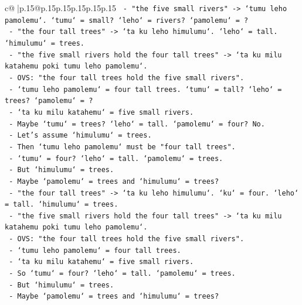 \documentclass{article}
\begin{document}
{\begin{supertabular}{c@{$\;$}|p{.15\linewidth}@{}p{.15\linewidth}p{.15\linewidth}p{.15\linewidth}p{.15\linewidth}p{.15\linewidth}}
{{{\texttt{            {-} "the five small rivers" {-}> `tumu leho pamolemu`. `tumu` = small? `leho` = rivers? `pamolemu` = ?} \\
\texttt{            {-} "the four tall trees" {-}> `ta ku leho himulumu`. `leho` = tall. `himulumu` = trees.} \\
\texttt{            {-} "the five small rivers hold the four tall trees" {-}> `ta ku milu katahemu poki tumu leho pamolemu`.} \\
\texttt{              {-} OVS: "the four tall trees hold the five small rivers".} \\
\texttt{              {-} `tumu leho pamolemu` = four tall trees. `tumu` = tall? `leho` = trees? `pamolemu` = ?} \\
\texttt{              {-} `ta ku milu katahemu` = five small rivers.} \\
\texttt{              {-} Maybe `tumu` = trees? `leho` = tall. `pamolemu` = four? No.} \\
\texttt{              {-} Let's assume `himulumu` = trees.} \\
\texttt{              {-} Then `tumu leho pamolemu` must be "four tall trees".} \\
\texttt{              {-} `tumu` = four? `leho` = tall. `pamolemu` = trees.} \\
\texttt{              {-} But `himulumu` = trees.} \\
\texttt{              {-} Maybe `pamolemu` = trees and `himulumu` = trees?} \\
\texttt{              {-} "the four tall trees" {-}> `ta ku leho himulumu`. `ku` = four. `leho` = tall. `himulumu` = trees.} \\
\texttt{              {-} "the five small rivers hold the four tall trees" {-}> `ta ku milu katahemu poki tumu leho pamolemu`.} \\
\texttt{                {-} OVS: "the four tall trees hold the five small rivers".} \\
\texttt{                {-} `tumu leho pamolemu` = four tall trees.} \\
\texttt{                {-} `ta ku milu katahemu` = five small rivers.} \\
\texttt{                {-} So `tumu` = four? `leho` = tall. `pamolemu` = trees.} \\
\texttt{                {-} But `himulumu` = trees.} \\
\texttt{                {-} Maybe `pamolemu` = trees and `himulumu` = trees?} \\
}}}
\end{supertabular}}
\end{document}
